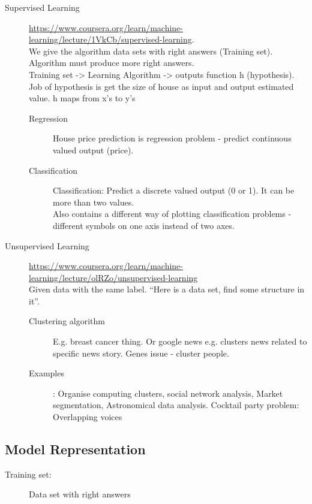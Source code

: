 \documentclass[a4paper]{report}
\begin{document}
\begin{description}
  \item[Supervised Learning] \url{https://www.coursera.org/learn/machine-learning/lecture/1VkCb/supervised-learning}. \\
  We give the algorithm data sets with right answers (Training set). Algorithm must produce more right answers.\\
  Training set -> Learning Algorithm ->  outputs function h (hypothesis). Job of hypothesis is get the size of house as input and output estimated value.
  h maps from x's to y's
  \begin{description}
    \item[Regression] House price prediction is regression problem - predict continuous valued output (price).
    \item[Classification] Classification: Predict a discrete valued output (0 or 1). It can be more than two values. \\
    Also contains a different way of plotting classification problems - different symbols on one axis instead of two axes.
  \end{description}
  \item[Unsupervised Learning] \url{https://www.coursera.org/learn/machine-learning/lecture/olRZo/unsupervised-learning} \\
  Given data with the same label. ``Here is a data set, find some structure in it''.
  \begin{description}
    \item[Clustering algorithm] E.g. breast cancer thing. Or google news e.g. clusters news related to specific news story. Genes issue - cluster people.
    \item[Examples]: Organise computing clusters, social network analysis, Market segmentation, Astronomical data analysis. Cocktail party problem: Overlapping voices
  \end{description}
\end{description}


\subsection{Model Representation}
\label{sec:model_rep}
\begin{description}
  \item[Training set:] Data set with right answers
\end{description}
\end{document}
